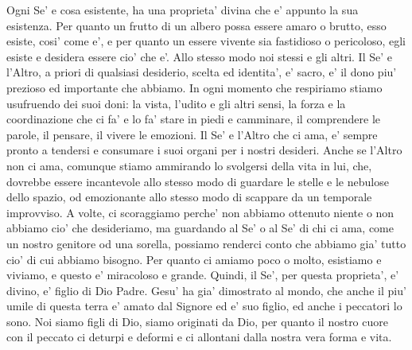  Ogni Se' e cosa esistente, ha una proprieta' divina che e' appunto la sua esistenza. Per quanto un frutto di un albero possa essere amaro o brutto, esso esiste, cosi' come e', e per quanto un essere vivente sia fastidioso o pericoloso, egli esiste e desidera essere cio' che e'. Allo stesso modo noi stessi e gli altri.  Il Se' e l'Altro, a priori di qualsiasi desiderio, scelta ed identita', e' sacro, e' il dono piu' prezioso ed importante che abbiamo. In ogni momento che respiriamo stiamo usufruendo dei suoi doni: la vista, l'udito e gli altri sensi, la forza e la coordinazione che ci fa' e lo fa' stare in piedi e camminare, il comprendere le parole, il pensare, il vivere le emozioni. Il Se' e l'Altro che ci ama, e' sempre pronto a tendersi e consumare i suoi organi per i nostri desideri. Anche se l'Altro non ci ama, comunque stiamo ammirando lo svolgersi della vita in lui, che, dovrebbe essere incantevole allo stesso modo di guardare le stelle e le nebulose dello spazio, od emozionante allo stesso modo di scappare da un temporale improvviso. A volte, ci scoraggiamo perche' non abbiamo ottenuto niente o non abbiamo cio' che desideriamo, ma guardando al Se' o al Se' di chi ci ama, come un nostro genitore od una sorella, possiamo renderci conto che abbiamo gia' tutto cio' di cui abbiamo bisogno.
Per quanto ci amiamo poco o molto, esistiamo e viviamo, e questo e' miracoloso e grande. Quindi, il Se', per questa proprieta', e' divino, e' figlio di Dio Padre. Gesu' ha gia' dimostrato al mondo, che anche il piu' umile di questa terra e' amato dal Signore ed e' suo figlio, ed anche i peccatori lo sono. Noi siamo figli di Dio, siamo originati da Dio, per quanto il nostro cuore con il peccato ci deturpi e deformi e ci allontani dalla nostra vera forma e vita. 

